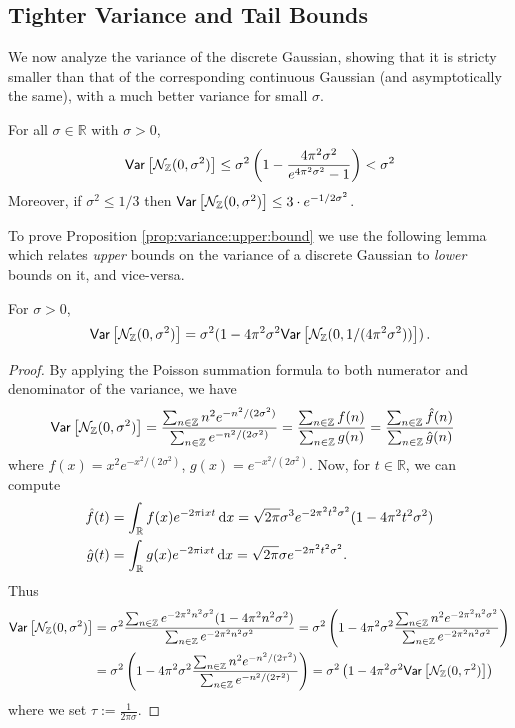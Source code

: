 \documentclass{jpc}
\newcommand{\ii}{\mathrm{i}\mkern1mu}
\newcommand{\var}[2]{{\ifx&#1& \mathsf{Var} \else
\underset{#1}{\mathsf{Var}} \fi \left[#2\right]}}
\newcommand{\eqdef}{:=}
\newcommand{\dx}[1][x]{\mathrm{d}#1}
\newcommand{\Z}{\mathbb{Z}}
\newcommand{\R}{\mathbb{R}}
\begin{document}
\subsection{Tighter Variance and Tail Bounds}
\label{sec:tighter-bounds}
We now analyze the variance of the discrete Gaussian, showing that it is stricty smaller than that of the corresponding continuous Gaussian (and asymptotically the same), with a much better variance for small $\sigma$.
\begin{prop}[Variance]
  \label{prop:variance:upper:bound}
    For all $\sigma \in \R$ with $\sigma>0$,
\begin{equation}
\var{}{\discN(0,\sigma^2)} \leq \sigma^2 \left(1 - \frac{4\pi^2\sigma^2}{e^{4\pi^2\sigma^2}-1} \right)<\sigma^2
\end{equation}
Moreover, if $\sigma^2\le 1/3$ then $\var{}{\discN(0,\sigma^2)} \le 3 \cdot e^{-1/2\sigma^2}$.
\end{prop}
To prove Proposition \ref{prop:variance:upper:bound} we use the following lemma which relates \emph{upper} bounds on the variance of a discrete Gaussian to \emph{lower} bounds on it, and vice-versa.
\begin{lem}\label{lem:upper=lower}
For $\sigma>0$, 
\begin{equation}
    \label{eq:relation:variances}
\var{}{\discN(0,\sigma^2)} = \sigma^2 (1 - 4\pi^2\sigma^2\var{}{\discN(0,1/(4\pi^2\sigma^2))} )\,.
\end{equation}
\end{lem}
\begin{proof}
By applying the Poisson summation formula to both numerator and denominator of the variance, we have
\begin{align*}
    \var{}{\discN(0,\sigma^2)} 
    &= \frac{\sum_{n\in \Z} n^2 e^{-n^2/(2\sigma^2)}}{\sum_{n\in\Z} e^{-n^2/(2\sigma^2)}}
    = \frac{\sum_{n\in \Z} f(n)}{\sum_{n\in \Z} g(n)}
    = \frac{\sum_{n\in \Z} \hat{f}(n)}{\sum_{n\in \Z} \hat{g}(n)}
\end{align*}
where $f(x) = x^2 e^{-x^2/(2\sigma^2)}$, $g(x) = e^{-x^2/(2\sigma^2)}$. Now, for $t\in\R$, we can compute
\begin{align*}
    \hat{f}(t) &= \int_{\R} f(x) e^{-2\pi\ii{}x t}\,\dx = \sqrt{2\pi} \sigma^3 e^{-2\pi^2t^2\sigma^2} (1- 4\pi^2t^2\sigma^2)\\
    \hat{g}(t) &= \int_{\R} g(x) e^{-2\pi\ii{}x t}\,\dx = \sqrt{2\pi} \sigma e^{-2\pi^2t^2\sigma^2}.
\end{align*}
Thus
\begin{align*}
    \var{}{\discN(0,\sigma^2)} 
    &= \sigma^2\frac{\sum_{n\in \Z} e^{-2\pi^2n^2\sigma^2} (1- 4\pi^2n^2\sigma^2) }{\sum_{n\in \Z} e^{-2\pi^2n^2\sigma^2}}
    = \sigma^2\left( 1 - 4\pi^2\sigma^2\frac{\sum_{n\in \Z} n^2e^{-2\pi^2n^2\sigma^2} }{\sum_{n\in \Z} e^{-2\pi^2n^2\sigma^2}}\right) \\
    &= \sigma^2\left( 1 - 4\pi^2\sigma^2\frac{\sum_{n\in \Z} n^2 e^{-n^2/(2\tau^2)} }{\sum_{n\in \Z} e^{-n^2/(2\tau^2)}}\right)
    = \sigma^2\left( 1 - 4\pi^2\sigma^2\var{}{\discN(0,\tau^2)} \right)
\end{align*}
where we set $\tau \eqdef \frac{1}{2\pi\sigma}$.
\end{proof}
\end{document}
